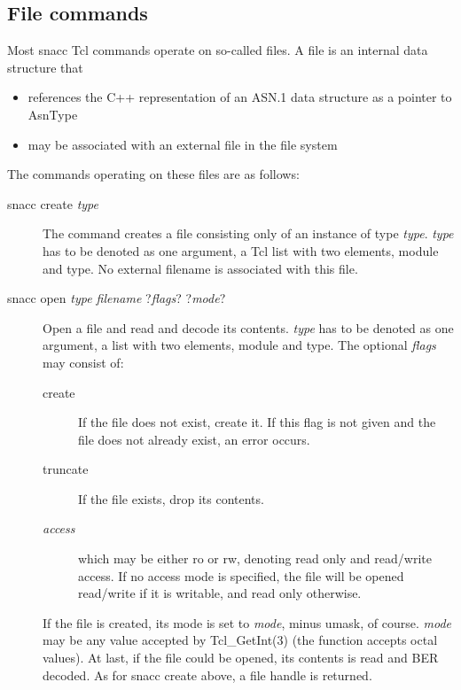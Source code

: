 \subsection{File commands}

Most snacc Tcl commands operate on so-called files.
A file is an internal data structure that
\begin{itemize}
  \item references the C++ representation of an ASN.1 data structure as a pointer to {\C AsnType}
  \item may be associated with an external file in the file system
\end{itemize}

The commands operating on these files are as follows:

\begin{description}%
  \item[{\Tcl snacc create \emph{type}}]
    The command creates a file consisting only of an instance of type \emph{type}.
    \emph{type} has to be denoted as one argument, a Tcl list with two elements, module and type.
    No external filename is associated with this file.

  \item[{\Tcl snacc open \emph{type filename} ?\emph{flags}? ?\emph{mode}?}]
    Open a file and read and decode its contents.
    \emph{type} has to be denoted as one argument, a list with two elements, module and type.
    The optional \emph{flags} may consist of:
    \begin{description}
      \item[{\Tcl create}] If the file does not exist, create it.
	If this flag is not given and the file does not already exist, an error occurs.
      \item[{\Tcl truncate}] If the file exists, drop its contents.
      \item[{\Tcl \emph{access}}] which may be either {\Tcl ro} or {\Tcl rw}, denoting read only and read/write access.
	If no access mode is specified, the file will be opened read/write if it is writable, and read only otherwise.
    \end{description}
    If the file is created, its mode is set to \emph{mode}, minus umask, of course.
    \emph{mode} may be any value accepted by {\C Tcl\_GetInt(3)} (the function accepts octal values).
    At last, if the file could be opened, its contents is read and BER decoded.
    As for {\Tcl snacc create} above, a file handle is returned.


\end{description}

